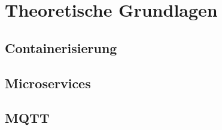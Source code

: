 
\section{Theoretische Grundlagen}

\subsection{Containerisierung}

\subsection{Microservices}

\subsection{MQTT}
